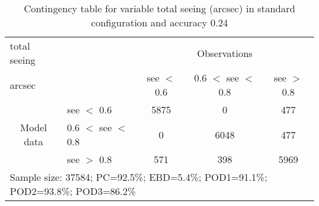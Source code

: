 \begin{table}[]
\begin{center}
\begin{tabular}{llccc}
\hline
{total seeing}                                       &                                                    & \multicolumn{3}{c}{Observations}                 \\
{arcsec}                                       &                             & see $<$ 0.6   & 0.6 $<$ see $<$ 0.8 & see $>$ 0.8 \\
\hline
\multicolumn{1}{c}{\multirow{3}{*}{Model data}}  & see $<$ 0.6             & 5875                & 0                       & 477              \\
                                                 & 0.6  $<$ see $<$ 0.8 & 0                & 6048                       & 477              \\
                                                 & see $>$ 0.8             & 571                & 398                       & 5969              \\
\hline
\multicolumn{5}{l}{Sample size: 37584; PC=92.5\%; EBD=5.4\%; POD1=91.1\%; POD2=93.8\%; POD3=86.2\%}
\end{tabular}
\end{center}
\caption{Contingency table for variable total seeing (arcsec) in standard configuration and accuracy 0.24}
\label{tab:contingencyseeBEF}
\end{table}

